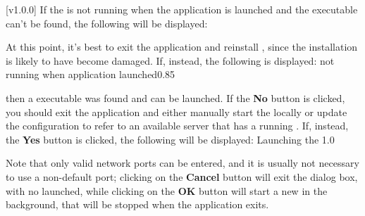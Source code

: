 [v1.0.0]
If the \emph{\RS} is not running when the \emph{\CMU} application is launched and the
\emph{\RS} executable can't be found, the following will be displayed:

At this point, it's best to exit the \emph{\CMU} application and reinstall \mplusm, since
the installation is likely to have become damaged.
If, instead, the following is displayed:
%
{\emph{\RS} not running when application launched}{0.85}

then a \emph{\RS} executable was found and can be launched.
If the \textbf{No} button is clicked, you should exit the \emph{\CMU} application and
either manually start the \emph{\RS} locally or update the \yarp{} configuration to refer
to an available \yarp{} server that has a running \emph{\RS}.
\condPage{}
If, instead, the \textbf{Yes} button is clicked, the following will be displayed:
%
{Launching the \emph{\RS}}{1.0}

Note that only valid network ports can be entered, and it is usually not necessary to use
a non-default port; clicking on the \textbf{Cancel} button will exit the dialog box, with
no \emph{\RS} launched, while clicking on the \textbf{OK} button will start a new
\emph{\RS} in the background, that will be stopped when the \emph{\CMU} application exits.
\appendixEnd{}
